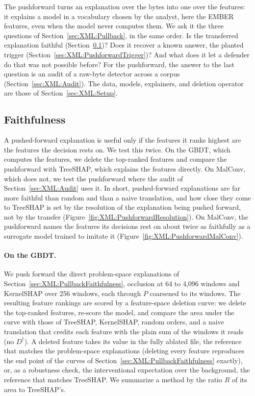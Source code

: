 The pushforward turns an explanation over the bytes into one over the features: it explains a model in a vocabulary
chosen by the analyst, here the EMBER features, even when the model never computes them. We ask it the three questions of
Section~\ref{sec:XML:Pullback}, in the same order. Is the transferred explanation faithful
(Section~\ref{sec:XML:PushforwardFaithfulness})? Does it recover a known answer, the planted trigger
(Section~\ref{sec:XML:PushforwardTrigger})? And what does it let a defender do that was not possible before? For the
pushforward, the answer to the last question is an audit of a raw-byte detector across a corpus
(Section~\ref{sec:XML:Audit}). The data, models, explainers, and deletion operator are those of
Section~\ref{sec:XML:Setup}.

\subsection{Faithfulness}
\label{sec:XML:PushforwardFaithfulness}

A pushed-forward explanation is useful only if the features it ranks highest are the features the decision rests on.
We test this twice. On the GBDT, which computes the features, we delete the top-ranked features and compare the
pushforward with TreeSHAP, which explains the features directly. On MalConv, which does not, we test the pushforward
where the audit of Section~\ref{sec:XML:Audit} uses it. In short, pushed-forward explanations are far more faithful than
random and than a naive translation, and how close they come to TreeSHAP is set by the resolution of the explanation
being pushed forward, not by the transfer (Figure~\ref{fig:XML:PushforwardResolution}). On MalConv, the pushforward
names the features its decisions rest on about twice as faithfully as a surrogate model trained to imitate it
(Figure~\ref{fig:XML:PushforwardMalConv}).

\paragraph{On the GBDT\@.} We push forward the direct problem-space explanations of
Section~\ref{sec:XML:PullbackFaithfulness}, occlusion at 64 to 4{,}096 windows and KernelSHAP over 256 windows, each
through $P$ coarsened to its windows. The resulting feature rankings are scored by a feature-space deletion curve: we
delete the top-ranked features, re-score the model, and compare the area under the curve with those of TreeSHAP,
KernelSHAP, random orders, and a naive translation that credits each feature with the plain sum of the windows it reads
(no $D^{\dagger}$). A deleted feature takes its value in the fully ablated file, the reference that matches the
problem-space explanations (deleting every feature reproduces the end point of the curves of
Section~\ref{sec:XML:PullbackFaithfulness} exactly), or, as a robustness check, the interventional expectation over the
background, the reference that matches TreeSHAP. We summarize a method by the ratio $R$ of its area to TreeSHAP's.

